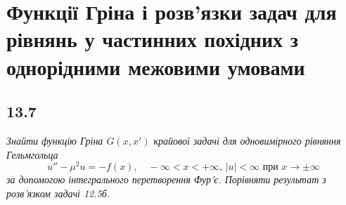 \documentclass[a4paper, 14pt]{extreport}
\begin{document}
\chapter{Функції Гріна і розв’язки задач для рівнянь у частинних похідних з однорідними межовими умовами}

\section[Задача №13.7]{13.7}

\textit{Знайти функцію Гріна $G(x,x')$ крайової задачі для одновимірного рівняння Гельмгольца \[u'' - \mu^2 u = - f(x), \quad -\infty < x < +\infty, \, |u| < \infty \text{ при } x \to \pm\infty \] за допомогою інтегрального перетворення Фур’є. Порівняти результат з розв’язком задачі 12.5б.}
\end{document}
